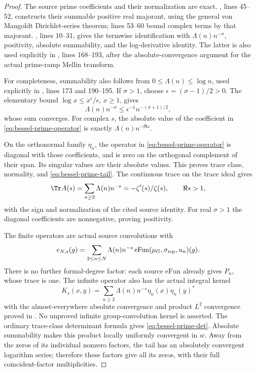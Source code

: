 \begin{proof}
The source prime coefficients and their normalization are exact.
,
lines 45--52, constructs their summable positive real majorant,
using the general von Mangoldt Dirichlet-series theorem; lines
53--60 bound complex terms by that majorant.
,
lines 10--31, gives the termwise identification with
\(\Lambda(n)n^{-\sigma}\), positivity, absolute summability,
and the log-derivative identity.  The latter is also used
explicitly in
,
lines 168--193, after the absolute-convergence argument for the
actual prime-ramp Mellin transform.

For completeness, summability also follows from
\(0\le\Lambda(n)\le\log n\), used explicitly in
,
lines 173 and 190--195.  If \(\sigma>1\), choose
\(\epsilon=(\sigma-1)/2>0\).  The elementary bound
\(\log x\le x^\epsilon/\epsilon\), \(x\ge1\), gives
\[
 \Lambda(n)n^{-\sigma}
 \le\epsilon^{-1}n^{-(\sigma+1)/2},
\]
whose sum converges.  For complex \(s\), the absolute value of
the coefficient in \eqref{eq:bessel-prime-operator} is exactly
\(\Lambda(n)n^{-\Re s}\).

On the orthonormal family \(\eta_n\), the operator in
\eqref{eq:bessel-prime-operator} is diagonal with those
coefficients, and is zero on the orthogonal complement of
their span.  Its singular values are their absolute values.
This proves trace class, normality, and
\eqref{eq:bessel-prime-tail}.  The continuous trace on the
trace ideal gives
\[
 \Tr A(s)=\sum_{n\ge2}\Lambda(n)n^{-s}
 =-\zeta'(s)/\zeta(s),\qquad \Re s>1,
\]
with the sign and normalization of the cited source identity.
For real \(\sigma>1\) the diagonal coefficients are
nonnegative, proving positivity.

The finite operators are actual source convolutions with
\[
 e_{N,s}(g)=
 \sum_{2\le n\le N}\Lambda(n)n^{-s}
 \,\mathrm{eFun}(\mu_G,\sigma_{\rm rep},u_n)(g).
\]
There is no further formal-degree factor: each source
\(\mathrm{eFun}\) already gives \(P_n\), whose trace is one.
The infinite operator also has the actual integral kernel
\[
 K_s(x,y)=\sum_{n\ge2}\Lambda(n)n^{-s}
                 \eta_n(x)\eta_n(y)^*
\]
with the almost-everywhere absolute convergence and product
\(L^2\) convergence proved in .
No unproved infinite group-convolution kernel is asserted.
The ordinary trace-class determinant formula gives
\eqref{eq:bessel-prime-det}.  Absolute summability makes this
product locally uniformly convergent in \(w\).
Away from the zeros of its individual nonzero factors,
the tail has an absolutely convergent logarithm series;
therefore these factors give all its zeros, with their full
coincident-factor multiplicities.


\end{proof}
